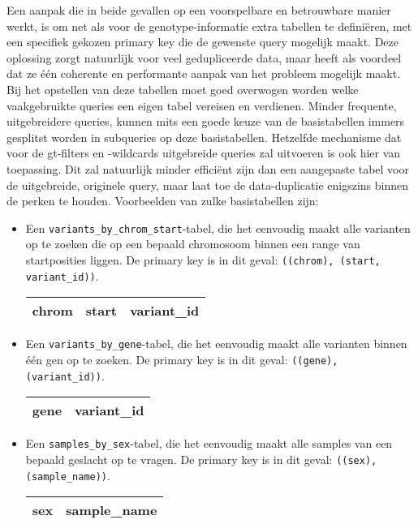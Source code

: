 Een aanpak die in beide gevallen op een voorspelbare en betrouwbare manier werkt, is om net als voor de genotype-informatie extra tabellen te defini\"eren, met een specifiek gekozen primary key die de gewenste query mogelijk maakt. Deze oplossing zorgt natuurlijk voor veel gedupliceerde data, maar heeft als voordeel dat ze \'e\'en coherente en performante aanpak van het probleem mogelijk maakt. Bij het opstellen van deze tabellen moet goed overwogen worden welke vaakgebruikte queries een eigen tabel vereisen en verdienen. Minder frequente, uitgebreidere queries, kunnen mits een goede keuze van de basistabellen immers gesplitst worden in subqueries op deze basistabellen. Hetzelfde mechanisme dat voor de gt-filters en -wildcards uitgebreide queries zal uitvoeren is ook hier van toepassing. Dit zal natuurlijk minder effici\"ent zijn dan een aangepaste tabel voor de uitgebreide, originele query, maar laat toe de data-duplicatie enigszins binnen de perken te houden. Voorbeelden van zulke basistabellen zijn:

\begin{itemize}
\item Een \texttt{variants\_by\_chrom\_start}-tabel, die het eenvoudig maakt alle varianten op te zoeken die op een bepaald chromosoom binnen een range van startposities liggen. De primary key is in dit geval: \texttt{((chrom), (start, variant\_id))}. 

\begin{table}[!htbp]
\begin{tabular}{@{}|l|l|l|@{}}
\toprule
 chrom & start & variant\_id \\ \bottomrule
\end{tabular}
\end{table}

\item Een \texttt{variants\_by\_gene}-tabel, die het eenvoudig maakt alle varianten binnen \'e\'en gen op te zoeken. De primary key is in dit geval: \texttt{((gene), (variant\_id))}.

\begin{table}[!htbp]
\begin{tabular}{@{}|l|l|@{}}
\toprule
 gene & variant\_id \\ \bottomrule
\end{tabular}
\end{table}

\item Een \texttt{samples\_by\_sex}-tabel, die het eenvoudig maakt alle samples van een bepaald geslacht op te vragen. De primary key is in dit geval: \texttt{((sex), (sample\_name))}.

\begin{table}[!htbp]
\begin{tabular}{@{}|l|l|@{}}
\toprule
 sex & sample\_name \\ \bottomrule
\end{tabular}
\end{table}
\end{itemize}

